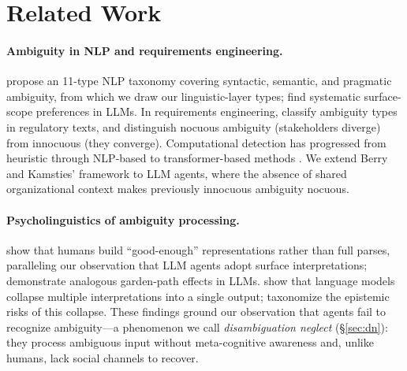 \section{Related Work}
\label{sec:related_work}

\paragraph{Ambiguity in NLP and requirements engineering.}
\citet{li_ambiguity_taxonomy_2024} propose an 11-type NLP taxonomy covering syntactic, semantic, and pragmatic ambiguity, from which we draw our linguistic-layer types; \citet{kamath_scope_2024} find systematic surface-scope preferences in LLMs. In requirements engineering, \citet{massey_ambiguity_re_2014} classify ambiguity types in regulatory texts, and \citet{berry_kamsties_2004} distinguish nocuous ambiguity (stakeholders diverge) from innocuous (they converge). Computational detection has progressed from heuristic \citep{chantree_2006} through NLP-based \citep{ferrari_ambiguity_2019} to transformer-based methods \citep{ezzini_taphsir_2022}. We extend Berry and Kamsties' framework to LLM agents, where the absence of shared organizational context makes previously innocuous ambiguity nocuous.

\paragraph{Psycholinguistics of ambiguity processing.}
\citet{ferreira_good_enough_2002} show that humans build ``good-enough'' representations rather than full parses, paralleling our observation that LLM agents adopt surface interpretations; \citet{li_garden_path_llm_2024} demonstrate analogous garden-path effects in LLMs. \citet{liu_ambiguity_2023} show that language models collapse multiple interpretations into a single output; \citet{gur_arieh_ambiguity_collapse_2026} taxonomize the epistemic risks of this collapse. These findings ground our observation that agents fail to recognize ambiguity---a phenomenon we call \emph{disambiguation neglect} (\S\ref{sec:dn}): they process ambiguous input without meta-cognitive awareness and, unlike humans, lack social channels to recover.

